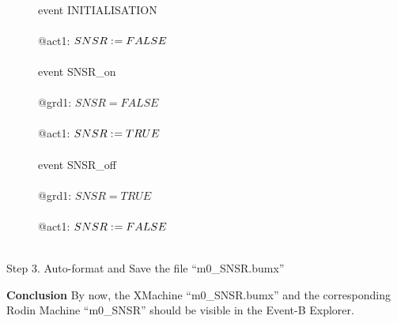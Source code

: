 \begin{description}
\begin{center}
\begin{Bcode}
		\Bevents\\
		\Btab event INITIALISATION\\
		\Btab \Bthen\\
		\Btab \Btab @act1: \(SNSR \mathrel{:\mkern1mu=} FALSE\)\\
		\Btab \Bend\\
		\Btab event SNSR_on\\
		\Btab \Bwhere\\
		\Btab \Btab @grd1: \(SNSR = FALSE\)\\
		\Btab \Bthen\\
		\Btab \Btab @act1: \(SNSR \mathrel{:\mkern1mu=} TRUE\)\\
		\Btab \Bend\\
		\Btab event SNSR_off\\
		\Btab \Bwhere\\
		\Btab \Btab @grd1: \(SNSR = TRUE\)\\
		\Btab \Bthen\\
		\Btab \Btab @act1: \(SNSR \mathrel{:\mkern1mu=} FALSE\)\\
		\Btab \Bend\\
		\Bend
		\fi
	\end{Bcode}
\end{center}

\item[Step 3. Auto-format and Save the file ``m0\_SNSR.bumx''] 
\end{description}

\textbf{Conclusion} By now, the XMachine ``m0\_SNSR.bumx'' and the corresponding Rodin Machine ``m0\_SNSR'' should be visible in the Event-B Explorer.

